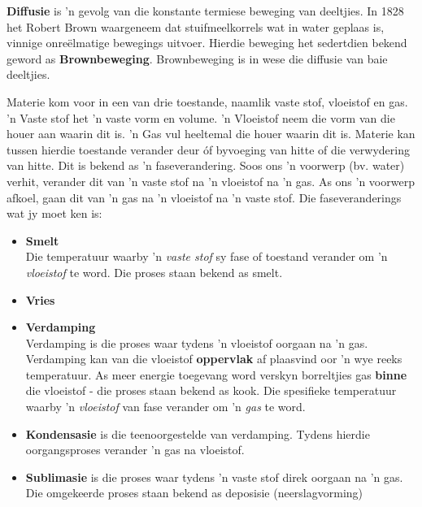 \par 
\label{m38736*id10987324}\textbf{Diffusie} is 'n gevolg van die konstante termiese beweging van deeltjies. In 1828 het Robert Brown waargeneem dat stuifmeelkorrels wat in water geplaas is, vinnige onreëlmatige bewegings uitvoer. Hierdie beweging het sedertdien bekend geword as \textbf{Brownbeweging}. Brownbeweging is in wese die diffusie van baie deeltjies.
\par 
\label{m38736*id48327}Materie kom voor in een van drie toestande, naamlik vaste stof, vloeistof en gas. 'n Vaste stof het 'n vaste vorm en volume. 'n Vloeistof neem die vorm van die houer aan waarin dit is. 'n Gas vul heeltemal die houer waarin dit is. Materie kan tussen hierdie toestande verander deur óf byvoeging van hitte of die verwydering van hitte. Dit is bekend as 'n faseverandering. Soos ons 'n voorwerp (bv. water) verhit, verander dit van 'n vaste stof na 'n vloeistof na 'n gas. As ons 'n voorwerp afkoel, gaan dit van 'n gas na 'n vloeistof na 'n vaste stof. Die faseveranderings wat jy moet ken is:
\label{m38736*id02341}\begin{itemize}[noitemsep]
\item \textbf{Smelt} \\ 
 { \label{m38734*meaningfhsst!!!underscore!!!id276}
Die temperatuur waarby 'n \textsl{vaste stof} sy fase of toestand verander om 'n \textsl{vloeistof} te word. Die proses staan bekend as smelt. } 
\item \textbf{Vries} \\
\item \textbf{Verdamping} \\
Verdamping is die proses waar tydens 'n vloeistof oorgaan na 'n gas. Verdamping kan van die vloeistof \textbf{oppervlak} af plaasvind oor 'n wye reeks temperatuur. As meer energie toegevang word verskyn borreltjies gas \textbf{binne} die vloeistof - die proses staan bekend as kook.
 { \label{m38734*meaningfhsst!!!underscore!!!id282}
Die spesifieke temperatuur waarby 'n \textsl{vloeistof} van fase verander om 'n \textsl{gas} te word.} 
\item \textbf{Kondensasie} is die teenoorgestelde van verdamping. Tydens hierdie oorgangsproses verander 'n gas na vloeistof.
\item \textbf{Sublimasie} is die proses waar tydens 'n vaste stof direk oorgaan na 'n gas. Die omgekeerde proses staan bekend as deposisie (neerslagvorming)\end{itemize}
